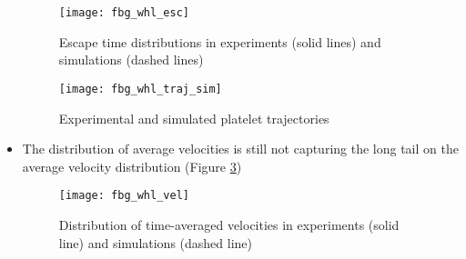 \documentclass{article}
\newcommand{\tn}{\textnormal}
\begin{document}
\begin{itemize}
  \begin{figure}[h]
    \centering
    \texttt{[image: fbg\_whl\_esc]}
    \caption{Escape time distributions in experiments (solid lines)
      and simulations (dashed lines)}
    \label{fig:fbg-whl-esc}
  \end{figure}

  \begin{figure}[h]
    \centering
    \texttt{[image: fbg\_whl\_traj\_sim]}
    \caption{Experimental and simulated platelet trajectories}
    \label{fig:fbg-whl-traj-sim}
  \end{figure}
\item The distribution of average velocities is still not capturing
  the long tail on the average velocity distribution (Figure
  \ref{fig:fbg-whl-vel}) 

  \begin{figure}[h]
    \centering
    \texttt{[image: fbg\_whl\_vel]}
    \caption{Distribution of time-averaged velocities in experiments
      (solid line) and simulations (dashed line)}
    \label{fig:fbg-whl-vel}
  \end{figure}

\end{itemize}

\end{document}
